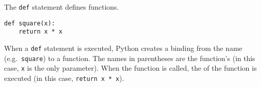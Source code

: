 The \texttt{def} statement defines functions.

\begin{lstlisting}
def square(x):
    return x * x
\end{lstlisting}

When a {\tt def} statement is executed, Python creates a binding from the
name (e.g.\ \texttt{square}) to a function. The names in parentheses are the
function's  (in this case, \texttt{x} is the only parameter).
When the function is called, the  of the function is executed (in this
case, \texttt{return x * x}).
